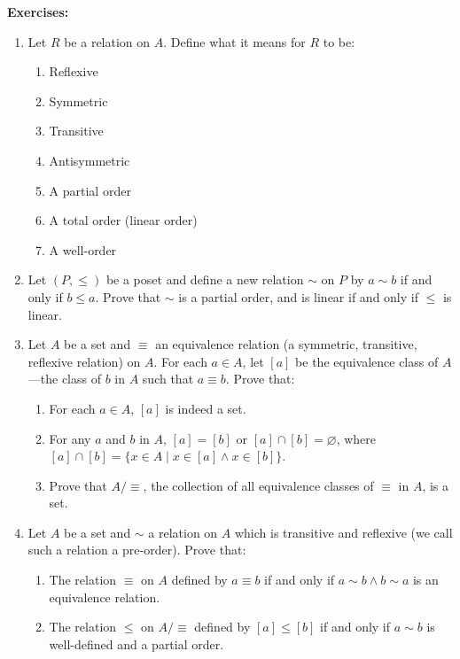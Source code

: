 \documentclass{article}
\begin{document}
\vfill




\clearpage





\textbf{Exercises:}\bigskip




\begin{enumerate}
	\item Let $R$ be a relation on $A$. Define what it means for $R$ to be:
		\begin{enumerate}
			\item Reflexive
			\item Symmetric
			\item Transitive
			\item Antisymmetric
			\item A partial order
			\item A total order (linear order)
			\item A well-order
		\end{enumerate}
	\item Let $(P,\leq)$ be a poset and define a new relation $\sim$ on $P$ by $a\sim b$ if and only if $b\leq a$. Prove that $\sim$ is a partial order, and is linear if and only if $\leq$ is linear.
	\item Let $A$ be a set and $\equiv$ an equivalence relation (a symmetric, transitive, reflexive relation) on $A$. For each $a\in A$, let $[a]$ be the equivalence class of $A$---the class of  $b$ in $A$ such that $a\equiv b$. Prove that:
		\begin{enumerate}
			\item For each $a\in A$, $[a]$ is indeed a set.
			\item For any $a$ and $b$ in $A$, $[a]=[b]$ or $[a]\cap[b]=\varnothing$, where $[a]\cap[b]=\{x\in A\mid x\in [a] \wedge x\in [b]\}$.
			\item Prove that $A/\!\!\equiv$, the collection of all equivalence classes of $\equiv$ in $A$, is a set.
		\end{enumerate}
	\item Let $A$ be a set and $\sim$ a relation on $A$ which is transitive and reflexive (we call such a relation a pre-order). Prove that:
		\begin{enumerate}
			\item The relation $\equiv$ on $A$ defined by $a\equiv b$ if and only if $a\sim b\wedge b\sim a$ is an equivalence relation.
			\item The relation $\leq$ on $A/\!\!\equiv$ defined by $[a]\leq [b]$ if and only if $a\sim b$ is well-defined and a partial order.
		\end{enumerate}
\end{enumerate}
\end{document}
